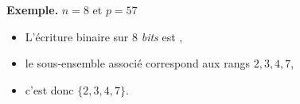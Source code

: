 \documentclass[12pt,class=report,crop=false]{standalone}
\begin{document}


\bigskip
\bigskip
\bigskip


\textbf{Exemple.} $n = 8$ et $p = 57$ 
\begin{itemize}
  \item L'écriture binaire sur $8$ \emph{bits} est \ci{[0,0,1,1,1,0,0,1]},
  \item le sous-ensemble associé correspond aux rangs $2,3,4,7$,
  \item c'est donc $\{2,3,4,7\}$.
\end{itemize}  

\end{document}
